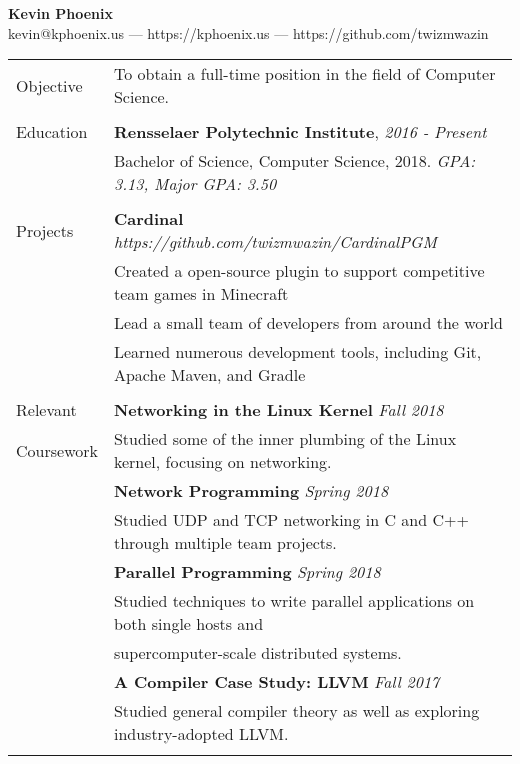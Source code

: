 \documentclass[letterpaper,10pt,oneside]{article}
\begin{document}
\begin{center}
    \Large{\textbf{Kevin Phoenix}} \normalsize \\
    kevin@kphoenix.us --- https://kphoenix.us --- https://github.com/twizmwazin
\end{center}

\noindent
\begin{tabular}{@{} l l}

  \Large{Objective}
  & To obtain a full-time position in the field of Computer Science. \\
  & \\

  \Large{Education}
  & \textbf{Rensselaer Polytechnic Institute}, \textit{2016 - Present} \\
  & Bachelor of Science, Computer Science, 2018. \textit{GPA: 3.13, Major GPA: 3.50} \\
  & \\

  \Large{Projects}
  & \textbf{Cardinal} \textit{https://github.com/twizmwazin/CardinalPGM} \\
  & Created a open-source plugin to support competitive team games in Minecraft \\
  & Lead a small team of developers from around the world \\
  & Learned numerous development tools, including Git, Apache Maven, and Gradle \\
  & \\

  \Large{Relevant}
  & \textbf{Networking in the Linux Kernel} \textit{Fall 2018} \\
  \Large{Coursework}
  & Studied some of the inner plumbing of the Linux kernel, focusing on networking. \\
  & \textbf{Network Programming} \textit{Spring 2018} \\
  & Studied UDP and TCP networking in C and C++ through multiple team projects. \\
  & \textbf{Parallel Programming} \textit{Spring 2018} \\
  & Studied techniques to write parallel applications on both single hosts and \\
  & supercomputer-scale distributed systems. \\
  & \textbf{A Compiler Case Study: LLVM} \textit{Fall 2017} \\
  & Studied general compiler theory as well as exploring industry-adopted LLVM. \\
  & \\


\end{tabular}
\end{document}

